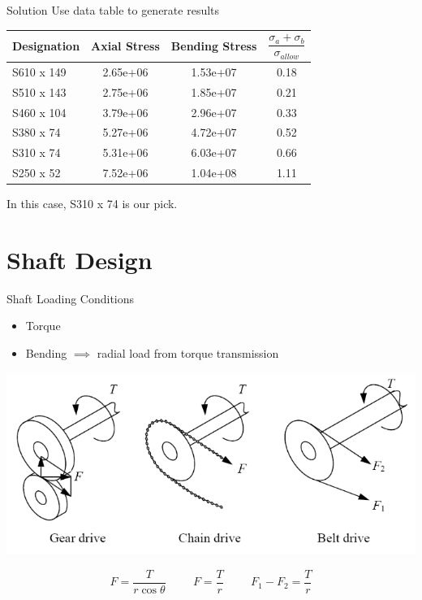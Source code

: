 \documentclass[10pt, svgnames]{beamer}
\begin{document}
\begin{frame}[label={sec:org04b68fd}]{Solution}
Use data table to generate results

\small
\begin{tabular}{lccc}
\toprule
Designation & Axial Stress & Bending Stress & $\dfrac{\sigma _a + \sigma_b}{\sigma_{allow}}$ \\
\midrule
S610 x 149 & 2.65e+06 & 1.53e+07 & 0.18 \\
S510 x 143 & 2.75e+06 & 1.85e+07 & 0.21 \\
S460 x 104 & 3.79e+06 & 2.96e+07 & 0.33 \\
S380 x 74 & 5.27e+06 & 4.72e+07 & 0.52 \\
S310 x 74 & 5.31e+06 & 6.03e+07 & 0.66 \\
S250 x 52 & 7.52e+06 & 1.04e+08 & 1.11 \\
\bottomrule
\end{tabular}

\normalsize
In this case, S310 x 74 is our pick.
\end{frame}

\section{Shaft Design}
\label{sec:org97b89a6}

\begin{frame}[label={sec:orga42b0e3}]{Shaft Loading Conditions}
\begin{itemize}
\item Torque
\item Bending \(\implies\) radial load from torque transmission
\end{itemize}

\begin{center}
\includegraphics[width=.9\linewidth]{./pictures/torque-transmission.png}
\end{center}

$$ F = \dfrac{T}{r \cos \theta} \hspace{1cm} F = \dfrac{T}{r} \hspace{1cm} F_1 - F_2 = \dfrac{T}{r} $$
\end{frame}
\end{document}
